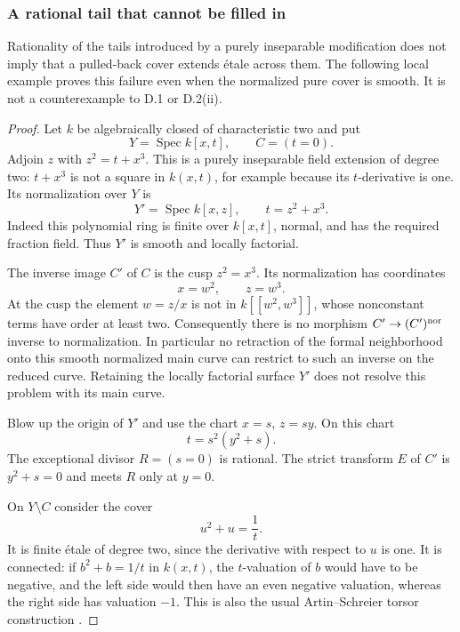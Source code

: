 \subsubsection{A rational tail that cannot be filled in}

\begin{example}
\label{D:pure-root-rational-tail-obstruction}
Rationality of the tails introduced by a purely inseparable
modification does not imply that a pulled-back cover extends
\'etale across them.  The following local example proves
this failure even when the normalized pure cover is smooth.
It is not a counterexample to D.1 or D.2(ii).
\end{example}

\begin{proof}
Let $k$ be algebraically closed of characteristic two and put
\[
       Y=\operatorname{Spec}k[x,t],\qquad C=(t=0).
\]
Adjoin $z$ with $z^2=t+x^3$.  This is a purely inseparable
field extension of degree two: $t+x^3$ is not a square in
$k(x,t)$, for example because its $t$-derivative is one.
Its normalization over $Y$ is
\[
       Y'=\operatorname{Spec}k[x,z],\qquad t=z^2+x^3.
\]
Indeed this polynomial ring is finite over $k[x,t]$,
normal, and has the required fraction field.  Thus $Y'$
is smooth and locally factorial.

The inverse image $C'$ of $C$ is the cusp $z^2=x^3$.
Its normalization has coordinates
\[
                      x=w^2,\qquad z=w^3.
\]
At the cusp the element $w=z/x$ is not in
$k[[w^2,w^3]]$, whose nonconstant terms have order at
least two.  Consequently there is no morphism
$C'\to(C')^{\rm nor}$ inverse to normalization.
In particular no retraction of the formal neighborhood
onto this smooth normalized main curve can restrict
to such an inverse on the reduced curve.  Retaining
the locally factorial surface $Y'$ does not resolve
this problem with its main curve.

Blow up the origin of $Y'$ and use the chart
$x=s$, $z=sy$.  On this chart
\[
                  t=s^2(y^2+s).
 \tag{PT}
\]
The exceptional divisor $R=(s=0)$ is rational.  The
strict transform $E$ of $C'$ is $y^2+s=0$ and meets
$R$ only at $y=0$.

On $Y\setminus C$ consider the cover
\[
                         u^2+u=\frac1t.
 \tag{PA}
\]
It is finite \'etale of degree two, since the derivative
with respect to $u$ is one.  It is connected: if
$b^2+b=1/t$ in $k(x,t)$, the $t$-valuation of $b$
would have to be negative, and the left side would
then have an even negative valuation, whereas the
right side has valuation $-1$.  This is also the
usual Artin--Schreier torsor construction
\cite[section 59.63, tag 0A3J]{StacksBFiniteCone}.


\end{proof}
